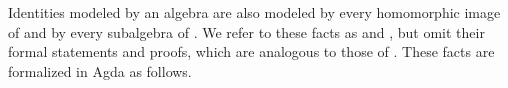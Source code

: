 \fi
Identities modeled by an algebra  are also modeled by every homomorphic image of
 and by every subalgebra of .
\ifshort
We refer to these facts as  and , but omit their formal
statements and proofs, which are analogous to those of .
\else
These facts are formalized in Agda as follows.

\begin{code}%
\>[0]\<%
\\
\>[0]\AgdaSpace{}%
\AgdaModule{\AgdaUnderscore{}}\AgdaSpace{}%
\AgdaSymbol{\{}\AgdaSpace{}%
\AgdaSymbol{:}\AgdaSpace{}%
\AgdaSpace{}%
\AgdaSymbol{\}\{}\AgdaSpace{}%
\AgdaSymbol{:}\AgdaSpace{}%
\AgdaSpace{}%
\AgdaSpace{}%
\AgdaSymbol{\}\{}\AgdaSpace{}%
\AgdaSymbol{:}\AgdaSpace{}%
\AgdaSpace{}%
\AgdaSpace{}%
\AgdaSymbol{\}\{}\AgdaSpace{}%
\AgdaSpace{}%
\AgdaSymbol{:}\AgdaSpace{}%
\AgdaSpace{}%
\AgdaSymbol{\}}\AgdaSpace{}%
\<%
\\
%
\\[\AgdaEmptyExtraSkip]%
\>[0][@{}l@{\AgdaIndent{0}}]%
\>[1]\AgdaSpace{}%
\AgdaSymbol{:}\AgdaSpace{}%
\AgdaSpace{}%
\AgdaSpace{}%
\AgdaSpace{}%
\AgdaSpace{}%
\AgdaSpace{}%
\AgdaSpace{}%
\AgdaSpace{}%
\AgdaSpace{}%
\AgdaSpace{}%
\AgdaSpace{}%
\AgdaSpace{}%
\AgdaSpace{}%
\AgdaSpace{}%
\AgdaSpace{}%
\<%
\\
%
\>[1]\AgdaSpace{}%
\AgdaSpace{}%
\AgdaSymbol{(}\AgdaSpace{}%
\AgdaOperator{\AgdaInductiveConstructor{,}}\AgdaSpace{}%
\AgdaSymbol{)}\AgdaSpace{}%
\AgdaSpace{}%
\AgdaSymbol{=}\<%
\\
\>[1][@{}l@{\AgdaIndent{0}}]%
\>[2]\<%
\\
\>[2][@{}l@{\AgdaIndent{0}}]%
\>[7]\AgdaSpace{}%
\AgdaSpace{}%
%
\>[15]%
\>[33]%

\end{code}
